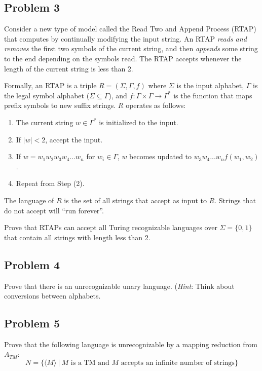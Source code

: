 \documentclass{article}
\begin{document}
\newpage
\subsection*{Problem 3}

Consider a new type of model called the \textsf{Read Two and Append Process} (\textsf{RTAP}) that computes by continually modifying the input string. An \textsf{RTAP} \emph{reads and removes} the first two symbols of the current string, and then \emph{appends} some string to the end depending on the symbols read. The \textsf{RTAP} accepts whenever the length of the current string is less than 2.

Formally, an \textsf{RTAP} is a triple $R = (\Sigma, \Gamma, f)$ where $\Sigma$ is the input alphabet, $\Gamma$ is the legal symbol alphabet ($\Sigma \subseteq \Gamma$), and $f \colon \Gamma \times \Gamma \rightarrow \Gamma^*$ is the function that maps prefix symbols to new suffix strings. $R$ operates as follows:

\begin{enumerate}[(1)]
\item The current string $w \in \Gamma^*$ is initialized to the input.
\item If $|w| < 2$, accept the input.
\item If $w = w_1 w_2 w_3 w_4 ... w_n$ for $w_i \in \Gamma$, $w$ becomes updated to $w_3 w_4 ... w_n f(w_1, w_2)$.
\item Repeat from Step (2).
\end{enumerate}
The language of $R$ is the set of all strings that accept as input to $R$. Strings that do not accept will ``run forever''.

Prove that \textsf{RTAPs} can accept all Turing recognizable languages over $\Sigma= \{0,1\}$ that contain all strings with length less than 2.

\newpage
\subsection*{Problem 4}
Prove that there is an unrecognizable unary language. (\emph{Hint}: Think about conversions between alphabets.


\newpage
\subsection*{Problem 5}

Prove that the following language is unrecognizable by a mapping reduction from $\overline{A_{TM}}$:
\[ N = \{\langle M \rangle ~|~ \text{$M$ is a TM and $M$ accepts an infinite number of strings} \} \]
\end{document}
